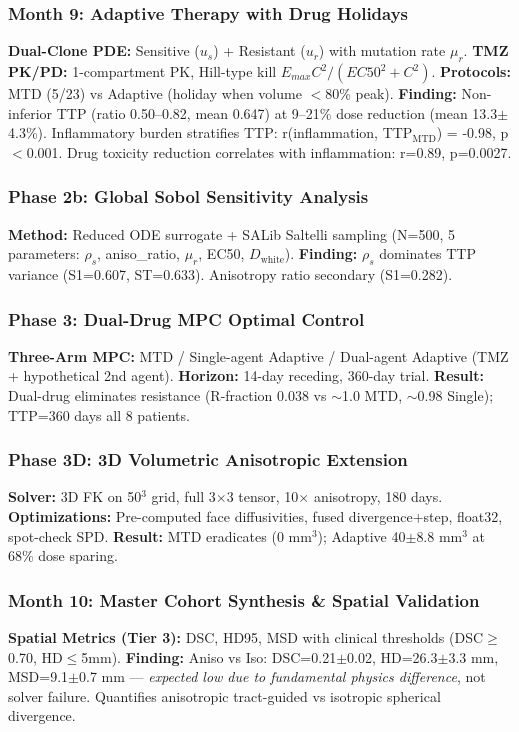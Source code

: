 \documentclass[11pt, twocolumn]{article}
\begin{document}
\subsubsection{Month 9: Adaptive Therapy with Drug Holidays}
\textbf{Dual-Clone PDE:} Sensitive ($u_s$) + Resistant ($u_r$) with mutation rate $\mu_r$.
\textbf{TMZ PK/PD:} 1-compartment PK, Hill-type kill $E_{max}C^2/(EC50^2+C^2)$.
\textbf{Protocols:} MTD (5/23) vs Adaptive (holiday when volume $<$80\% peak).
\textbf{Finding:} Non-inferior TTP (ratio 0.50--0.82, mean 0.647) at 9--21\% dose reduction (mean 13.3$\pm$4.3\%). Inflammatory burden stratifies TTP: r(inflammation, TTP$_{\text{MTD}}$) = -0.98, p$<$0.001. Drug toxicity reduction correlates with inflammation: r=0.89, p=0.0027.

\subsubsection{Phase 2b: Global Sobol Sensitivity Analysis}
\textbf{Method:} Reduced ODE surrogate + SALib Saltelli sampling (N=500, 5 parameters: $\rho_s$, aniso\_ratio, $\mu_r$, EC50, $D_{\text{white}}$).
\textbf{Finding:} $\rho_s$ dominates TTP variance (S1=0.607, ST=0.633). Anisotropy ratio secondary (S1=0.282).

\subsubsection{Phase 3: Dual-Drug MPC Optimal Control}
\textbf{Three-Arm MPC:} MTD / Single-agent Adaptive / Dual-agent Adaptive (TMZ + hypothetical 2nd agent).
\textbf{Horizon:} 14-day receding, 360-day trial.
\textbf{Result:} Dual-drug eliminates resistance (R-fraction 0.038 vs $\sim$1.0 MTD, $\sim$0.98 Single); TTP=360 days all 8 patients.

\subsubsection{Phase 3D: 3D Volumetric Anisotropic Extension}
\textbf{Solver:} 3D FK on 50$^3$ grid, full 3$\times$3 tensor, 10$\times$ anisotropy, 180 days.
\textbf{Optimizations:} Pre-computed face diffusivities, fused divergence+step, float32, spot-check SPD.
\textbf{Result:} MTD eradicates (0 mm$^3$); Adaptive 40$\pm$8.8 mm$^3$ at 68\% dose sparing.

\subsubsection{Month 10: Master Cohort Synthesis \& Spatial Validation}
\textbf{Spatial Metrics (Tier 3):} DSC, HD95, MSD with clinical thresholds (DSC$\geq$0.70, HD$\leq$5mm).
\textbf{Finding:} Aniso vs Iso: DSC=0.21$\pm$0.02, HD=26.3$\pm$3.3 mm, MSD=9.1$\pm$0.7 mm — \textit{expected low due to fundamental physics difference}, not solver failure. Quantifies anisotropic tract-guided vs isotropic spherical divergence.
\end{document}
